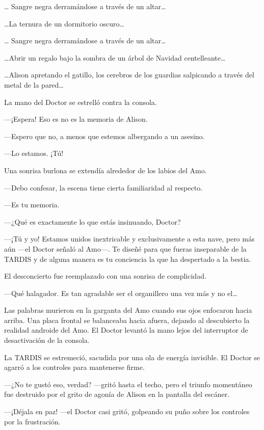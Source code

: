 {\ldots{} Sangre negra derramándose a través de un altar\ldots{}}

{\ldots{}La ternura de un dormitorio oscuro\ldots{}}

{\ldots{} Sangre negra derramándose a través de un altar\ldots{}}

{\ldots{}Abrir un regalo bajo la sombra de un árbol de Navidad
 centelleante\ldots{}}

{\ldots{}Alison apretando el gatillo, los cerebros de los guardias
 salpicando a través del metal de la pared\ldots{}}

{La mano del Doctor se estrelló contra la consola.}

{---¡Espera! Eso es no es la memoria de Alison.}

{---Espero que no, a menos que estemos albergando a un asesino.}

{---Lo estamos. ¡Tú!}

{Una sonrisa burlona se extendía alrededor de los labios del Amo.}

{---Debo confesar, la escena tiene cierta familiaridad al respecto.}

{---Es tu memoria.}

{---¿Qué es exactamente lo que estás insinuando, Doctor?}

{---¡Tú y yo! Estamos unidos inextricable y exclusivamente a esta nave,
 pero más aún ---el Doctor señaló al Amo---. Te diseñé para que fueras
 inseparable de la TARDIS y de alguna manera es tu conciencia la que ha
despertado a la bestia.}

{El desconcierto fue reemplazado con una sonrisa de complicidad.}

{---Qué halagador. Es tan agradable ser el organillero una vez más y no
 el\ldots{}}

{Las palabras murieron en la garganta del Amo cuando sus ojos enfocaron
 hacia arriba. Una placa frontal se balanceaba hacia afuera, dejando al
 descubierto la realidad androide del Amo. El Doctor levantó la mano
lejos del interruptor de desactivación de la consola.}

{La TARDIS se estremeció, sacudida por una ola de energía invisible. El
Doctor se agarró a los controles para mantenerse firme.}

{---¿No te gustó eso, verdad? ---gritó hasta el techo, pero el triunfo
 momentáneo fue destruido por el grito de agonía de Alison en la pantalla
del escáner.}

{---¡Déjala en paz! ---el Doctor casi gritó, golpeando su puño sobre los
controles por la frustración.}

